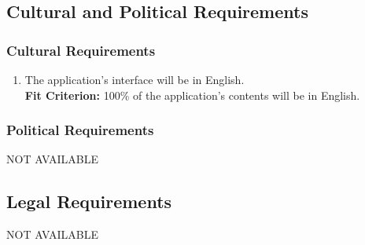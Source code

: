 \documentclass[12pt,letterpaper]{article}
\begin{document}
\subsection{Cultural and Political Requirements}
\subsubsection{Cultural Requirements}
\begin{enumerate}[{CU}1] 
	\item The application's interface will be in English. \\
	{\textbf{Fit Criterion:} 100\% of the application's contents will be in English. }
\end{enumerate}
\subsubsection{Political Requirements}
NOT AVAILABLE
\subsection{Legal Requirements}
NOT AVAILABLE

\newpage
\end{document}
